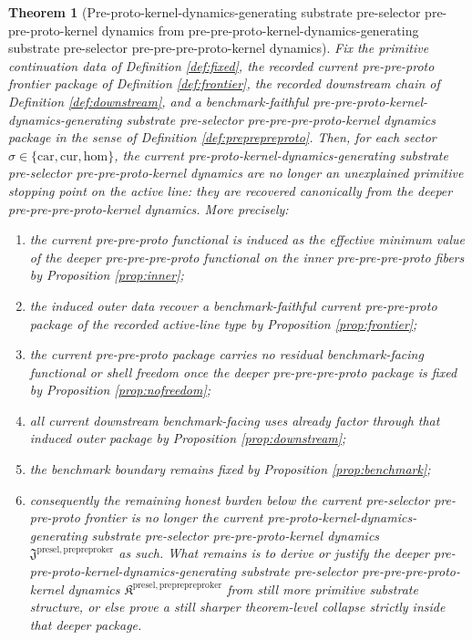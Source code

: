 \documentclass[11pt]{article}
\newcommand{\Car}{\mathrm{car}}
\newcommand{\Cur}{\mathrm{cur}}
\newcommand{\Hom}{\mathrm{hom}}
\newcommand{\PrePreProtoKernelPackage}{\mathfrak J^{\mathrm{presel,prepreproker}}}
\newcommand{\PrePrePreProtoKernelPackage}{\mathfrak K^{\mathrm{presel,preprepreproker}}}
\newtheorem{theorem}{Theorem}
\begin{document}
\begin{theorem}[Pre-proto-kernel-dynamics-generating substrate pre-selector pre-pre-proto-kernel dynamics from pre-pre-proto-kernel-dynamics-generating substrate pre-selector pre-pre-pre-proto-kernel dynamics]
\label{thm:main}
Fix the primitive continuation data of Definition \ref{def:fixed}, the recorded current pre-pre-proto frontier package of Definition \ref{def:frontier}, the recorded downstream chain of Definition \ref{def:downstream}, and a benchmark-faithful pre-pre-proto-kernel-dynamics-generating substrate pre-selector pre-pre-pre-proto-kernel dynamics package in the sense of Definition \ref{def:preprepreproto}. Then, for each sector \(\sigma\in\{\Car,\Cur,\Hom\}\), the current pre-proto-kernel-dynamics-generating substrate pre-selector pre-pre-proto-kernel dynamics are no longer an unexplained primitive stopping point on the active line: they are recovered canonically from the deeper pre-pre-pre-proto-kernel dynamics. More precisely:
\begin{enumerate}
    \item the current pre-pre-proto functional is induced as the effective minimum value of the deeper pre-pre-pre-proto functional on the inner pre-pre-pre-proto fibers by Proposition \ref{prop:inner};
    \item the induced outer data recover a benchmark-faithful current pre-pre-proto package of the recorded active-line type by Proposition \ref{prop:frontier};
    \item the current pre-pre-proto package carries no residual benchmark-facing functional or shell freedom once the deeper pre-pre-pre-proto package is fixed by Proposition \ref{prop:nofreedom};
    \item all current downstream benchmark-facing uses already factor through that induced outer package by Proposition \ref{prop:downstream};
    \item the benchmark boundary remains fixed by Proposition \ref{prop:benchmark};
    \item consequently the remaining honest burden below the current pre-selector pre-pre-proto frontier is no longer the current pre-proto-kernel-dynamics-generating substrate pre-selector pre-pre-proto-kernel dynamics \(\PrePreProtoKernelPackage\) as such. What remains is to derive or justify the deeper pre-pre-proto-kernel-dynamics-generating substrate pre-selector pre-pre-pre-proto-kernel dynamics \(\PrePrePreProtoKernelPackage\) from still more primitive substrate structure, or else prove a still sharper theorem-level collapse strictly inside that deeper package.
\end{enumerate}
\end{theorem}
\end{document}
